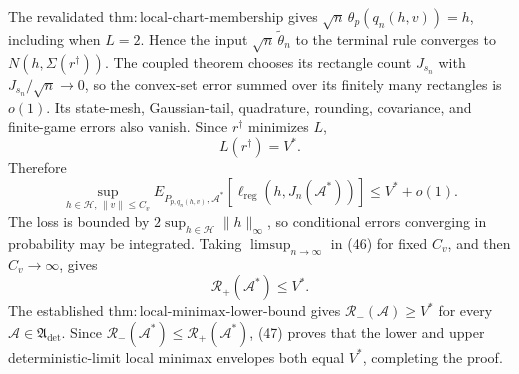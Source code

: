 The revalidated \(\mathrm{thm:local\text{-}chart\text{-}membership}\) gives \(\sqrt n\,\theta_p(q_n(h,v))=h\), including when \(L=2\). Hence the input \(\sqrt n\,\widetilde\theta_n\) to the terminal rule converges to \(N(h,\Sigma(r^\dagger))\). The coupled theorem chooses its rectangle count \(J_{s_n}\) with \(J_{s_n}/\sqrt n\to0\), so the convex-set error summed over its finitely many rectangles is \(o(1)\). Its state-mesh, Gaussian-tail, quadrature, rounding, covariance, and finite-game errors also vanish. Since \(r^\dagger\) minimizes \(L\),
\[
L(r^\dagger)=V^*.
\]
Therefore
\[
\sup_{h\in\mathcal H,\,\lVert v\rVert\le C_v}
E_{P_{p,q_n(h,v)},\mathcal A^*}
[\ell_{\mathrm{reg}}(h,J_n(\mathcal A^*))]
\le V^*+o(1).
\tag{46}
\]
The loss is bounded by \(2\sup_{h\in\mathcal H}\lVert h\rVert_\infty\), so conditional errors converging in probability may be integrated. Taking \(\limsup_{n\to\infty}\) in (46) for fixed \(C_v\), and then \(C_v\to\infty\), gives
\[
\mathcal R_+(\mathcal A^*)\le V^*.
\tag{47}
\]
The established \(\mathrm{thm:local\text{-}minimax\text{-}lower\text{-}bound}\) gives \(\mathcal R_-(\mathcal A)\ge V^*\) for every \(\mathcal A\in\mathfrak A_{\mathrm{det}}\). Since \(\mathcal R_-(\mathcal A^*)\le\mathcal R_+(\mathcal A^*)\), (47) proves that the lower and upper deterministic-limit local minimax envelopes both equal \(V^*\), completing the proof.
